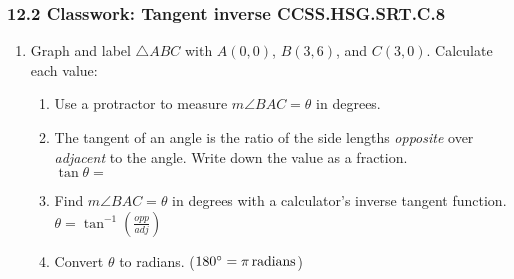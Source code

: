 

\fancyhead[LE]{\thepage}



\subsubsection*{12.2 Classwork: Tangent inverse \hfill CCSS.HSG.SRT.C.8}
\begin{enumerate}
\item Graph and label $\triangle ABC$ with $A(0,0)$, $B(3,6)$, and $C(3,0)$. Calculate each value:
  \begin{enumerate}[itemsep=1.25cm]  
    \item Use a protractor to measure $m\angle BAC= \theta$ in degrees.
    \item The tangent of an angle is the ratio of the side lengths \emph{opposite} over \emph{adjacent} to the angle. Write down the value as a fraction.\\[0.5cm]
      $\tan  \theta=$
    \item Find $m\angle BAC=\theta$ in degrees with a calculator's inverse tangent function.\\ $\displaystyle \theta = \tan^{-1}(\frac{opp}{adj})$
    \item Convert $ \theta$ to radians. ($180^\circ=\pi \, \rm{radians}$)
  \end{enumerate}


\end{enumerate}
